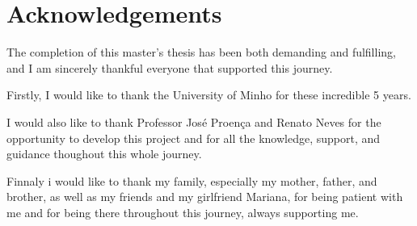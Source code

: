 \chapter*{Acknowledgements}
\setlength{\parskip}{1em}

The completion of this master’s thesis has been both demanding and fulfilling, and I am sincerely thankful everyone that supported this journey. 

Firstly, I would like to thank the University of Minho for these incredible 5 years. 

I would also like to thank Professor José Proença and Renato Neves for the opportunity to develop this project and for all the knowledge, support, and guidance thoughout this whole journey. 

Finnaly i would like to thank my family, especially my mother, father, and brother, as well as my friends and my girlfriend Mariana, for being patient with me and for being there throughout this journey, always supporting me.



\setlength{\parskip}{0em}